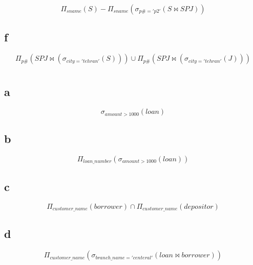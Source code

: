 \documentclass[a4paper]{article}
\makeatletter
\newcommand{\emailone}{\texttt{abbas.yazdanmehr1@gmail.com}}
\newcommand{\myinf}{
	\author{\noindent
عباس یزدان مهر
\\
99243077\\
 مهندسی کامپیوتر, دانشگاه شهید بهشتی
\\
\emailone
	}
}
\makeatother
\begin{document}
\begin{displaymath}
  \Pi_{sname}(S) - \Pi_{sname}(\sigma_{p\#='p2'}(S \bowtie SPJ))
\end{displaymath}

\subsection*{f}

\begin{latin}
\begin{displaymath}
  \Pi_{p\#}(SPJ \bowtie (\sigma_{city='tehran'}(S))) \cup \Pi_{p\#}(SPJ \bowtie (\sigma_{city='tehran'}(J)))
\end{displaymath}  
\end{latin}

\newpage
\myinf
\section{}
\subsection*{a}

\begin{displaymath}
  \sigma_{amount>1000} (loan)
\end{displaymath}

\subsection*{b}

\begin{displaymath}
  \Pi_{loan\_number}(\sigma_{amount>1000} (loan))
\end{displaymath}

\subsection*{c}

\begin{displaymath}
  \Pi_{customer\_name} (borrower) \cap \Pi_{customer\_name} (depositor)
\end{displaymath}


\subsection*{d}

\begin{displaymath}
  \Pi_{customer\_name} (\sigma_{branch\_name = 'centeral'} (loan \bowtie borrower))
\end{displaymath}
\end{document}
